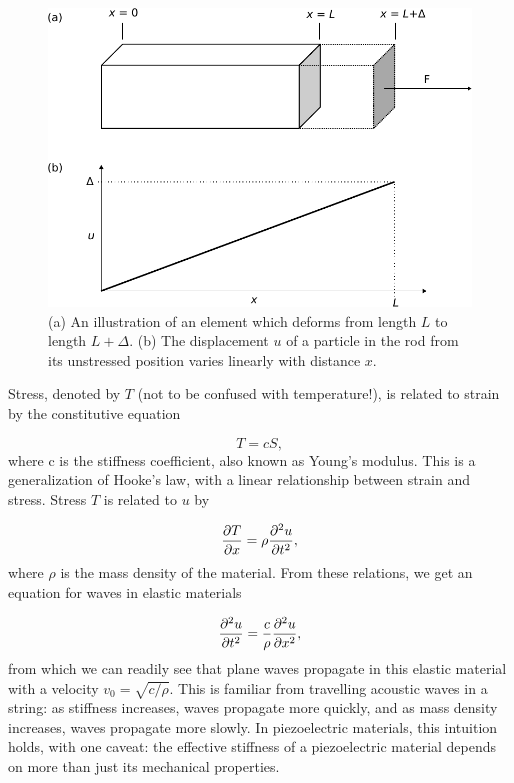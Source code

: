 \documentclass[double,12pt,1in,seploa]{beavtex}
\begin{document}
\begin{figure}
    \includegraphics{displacement field.pdf}
    \caption{(a) An illustration of an element which deforms from length $L$ to length $L + \Delta$. (b) The displacement $u$ of a particle in the rod from its unstressed position varies linearly with distance $x$.} \label{dfield}
\end{figure}
Stress, denoted by $T$ (not to be confused with temperature!), is related to strain by the constitutive equation

\begin{equation}
    T = cS, \label{elastic Hooke's}
\end{equation}
where c is the stiffness coefficient, also known as Young's modulus. This is a generalization of Hooke's law, with a linear relationship between strain and stress. Stress $T$ is related to $u$ by 

\begin{equation}
    \pdv{T}{x} = \rho \pdv[2]{u}{t}, \label{stress related to displacement}
\end{equation}
where $\rho$ is the mass density of the material. From these relations, we get an equation for waves in elastic materials

\begin{equation}
    \pdv[2]{u}{t} = \frac{c}{\rho} \pdv[2]{u}{x},
\end{equation}
from which we can readily see that plane waves propagate in this elastic material with a velocity $v_0 = \sqrt{c/\rho}$. This is familiar from travelling acoustic waves in a string: as stiffness increases, waves propagate more quickly, and as mass density increases, waves propagate more slowly. In piezoelectric materials, this intuition holds, with one caveat: the effective stiffness of a piezoelectric material depends on more than just its mechanical properties.
\end{document}
